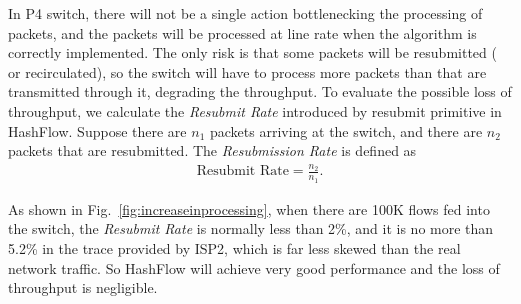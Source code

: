 In P4 switch, there will not be a single action bottlenecking the processing of packets, and the packets will be processed at line rate when the algorithm is correctly implemented. The only risk is that some packets will be resubmitted ( or recirculated), so the switch will have to process more packets than that are transmitted through it, degrading the throughput. To evaluate the possible loss of throughput, we calculate the \emph{Resubmit Rate} introduced by resubmit primitive in HashFlow. Suppose there are $n_1$ packets arriving at the switch, and there are $n_2$ packets that are resubmitted. The \emph{Resubmission Rate} is defined as 
\begin{eqnarray*}
\text{Resubmit Rate}=\frac{n_2}{n_1}.
\end{eqnarray*}


As shown in Fig.~\ref{fig:increaseinprocessing}, when there are 100K flows fed into the switch, the \emph{Resubmit Rate} is normally less than 2\%, and it is no more than 5.2\% in the trace provided by ISP2, which is far less skewed than the real network traffic. So HashFlow will achieve very good performance and the loss of throughput is negligible.





